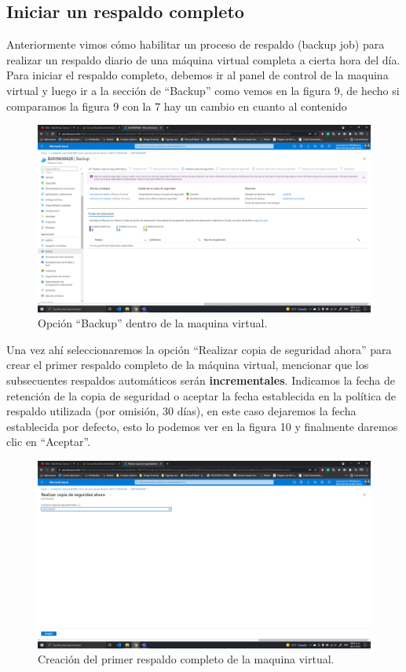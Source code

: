\documentclass[11pt]{article}
\begin{document}
		\subsection{Iniciar un respaldo completo}
		Anteriormente vimos cómo habilitar un proceso de respaldo (backup job) para realizar un respaldo diario de una máquina virtual completa a cierta hora del día. Para iniciar el respaldo completo, debemos ir al panel de control de la maquina virtual y luego ir a la sección de ``Backup'' como vemos en la figura 9, de hecho si comparamos la figura 9 con la 7 hay un cambio en cuanto al contenido
		\begin{figure}[H]
			\centering
			\includegraphics[scale=0.34]{resources/2.1.png}
			\caption{Opción ``Backup'' dentro de la maquina virtual.}\label{fig:picture}
		\end{figure}
		Una vez ahí seleccionaremos la opción ``Realizar copia de seguridad ahora'' para crear el primer respaldo completo de la máquina virtual, mencionar que los subsecuentes respaldos automáticos serán \textbf{incrementales}. Indicamos la fecha de retención de la copia de seguridad o aceptar la fecha establecida en la política de respaldo utilizada (por omisión, 30 días), en este caso dejaremos la fecha establecida por defecto, esto lo podemos ver en la figura 10 y finalmente daremos clic en ``Aceptar''.
		\begin{figure}[H]
			\centering
			\includegraphics[scale=0.34]{resources/2.2.png}
			\caption{Creación del primer respaldo completo de la maquina virtual.}\label{fig:picture}
		\end{figure}
\end{document}
